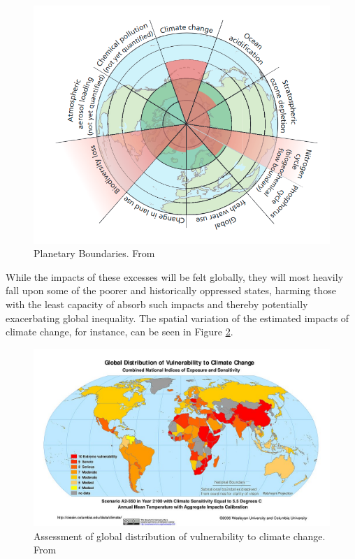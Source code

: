\begin{figure}[h]
	\centering
	\includegraphics[scale=0.4]{Figures/chap2/Planetary_Boundaries.png}
	\caption[Planetary Boundaries]{Planetary Boundaries. From \cite{rockstromSafeOperatingSpace2009}}
	\label{fig:boundaries}
\end{figure}

While the impacts of these excesses will be felt globally, they will most heavily fall upon some of the poorer and historically oppressed states, harming those with the least capacity of absorb such impacts and thereby potentially exacerbating global inequality. The spatial variation of the estimated impacts of climate change, for instance, can be seen in Figure \ref{fig:vulnerability}.

\begin{figure}[h]
	\centering
	\includegraphics[scale=1.7]{Figures/chap2/vulnerability_map.jpg}
	\caption[Assessment of global distribution of vulnerability to climate change]{Assessment of global distribution of vulnerability to climate change. From \cite{yoheSyntheticAssessmentGlobal2006}}
	\label{fig:vulnerability}
\end{figure}

